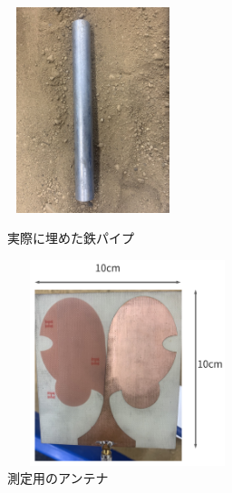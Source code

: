 \documentclass[12pt,a4paper]{jsreport}
\begin{document}
    

    \begin{figure}[htbp]
      \begin{minipage}[b]{0.45\linewidth}
        \centering
        \includegraphics[height=6cm,width=5cm]{./dataimage/exp_image/metalpipe.jpg}
        \caption{実際に埋めた鉄パイプ}\label{実際に埋めた鉄パイプ}
      \end{minipage}
      \begin{minipage}[b]{0.45\linewidth}
        \centering
        \includegraphics[height=6cm,width=7cm]{./image/antenna.pdf}
        \caption{測定用のアンテナ}\label{測定用のアンテナ}
      \end{minipage}
    \end{figure}
\end{document}
